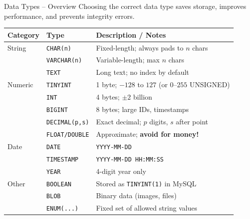 \begin{frame}{Data Types -- Overview}
  Choosing the correct data type saves storage, improves performance, and prevents integrity errors.

  \vspace{4pt}
  \begin{tabularx}{\linewidth}{@{}llX@{}}
    \toprule
    \textbf{Category} & \textbf{Type} & \textbf{Description / Notes} \\
    \midrule
    String  & \texttt{CHAR(n)}        & Fixed-length; always pads to $n$ chars \\
            & \texttt{VARCHAR(n)}     & Variable-length; max $n$ chars \\
            & \texttt{TEXT}           & Long text; no index by default \\
    \midrule
    Numeric & \texttt{TINYINT}        & 1 byte; $-128$ to $127$ (or $0$--$255$ UNSIGNED) \\
            & \texttt{INT}            & 4 bytes; $\pm 2$ billion \\
            & \texttt{BIGINT}         & 8 bytes; large IDs, timestamps \\
            & \texttt{DECIMAL(p,s)}   & Exact decimal; $p$ digits, $s$ after point \\
            & \texttt{FLOAT/DOUBLE}   & Approximate; \textbf{avoid for money!} \\
    \midrule
    Date    & \texttt{DATE}           & \texttt{YYYY-MM-DD} \\
            & \texttt{TIMESTAMP}      & \texttt{YYYY-MM-DD HH:MM:SS} \\
            & \texttt{YEAR}           & 4-digit year only \\
    \midrule
    Other   & \texttt{BOOLEAN}        & Stored as \texttt{TINYINT(1)} in MySQL \\
            & \texttt{BLOB}           & Binary data (images, files) \\
            & \texttt{ENUM(...)}      & Fixed set of allowed string values \\
    \bottomrule
  \end{tabularx}
\end{frame}

